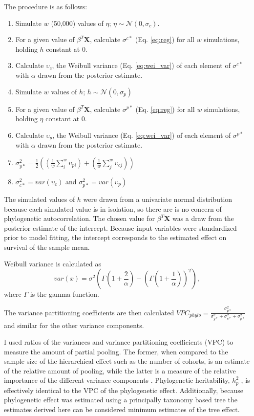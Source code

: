 \documentclass[12pt,letterpaper]{article}
\begin{document}
The procedure is as follows:
\begin{enumerate}
  \item Simulate \(w\) (50,000) values of \(\eta\); \(\eta \sim \mathcal{N}(0, \sigma_{c})\).
  \item For a given value of \(\beta^{T} \mathbf{X}\), calculate \(\sigma^{c*}\) (Eq. \ref{eq:reg}) for all \(w\) simulations, holding \(h\) constant at 0.
  \item Calculate \(\upsilon_{c}\), the Weibull variance (Eq. \ref{eq:wei_var}) of each element of \(\sigma^{c*}\) with \(\alpha\) drawn from the posterior estimate.
  \item Simulate \(w\) values of \(h\); \(h \sim \mathcal{N}(0, \sigma_{p})\)
  \item For a given value of \(\beta^{T} \mathbf{X}\), calculate \(\sigma^{p*}\) (Eq. \ref{eq:reg}) for all \(w\) simulations, holding \(\eta\) constant at 0.
  \item Calculate \(\upsilon_{p}\), the Weibull variance (Eq. \ref{eq:wei_var}) of each element of \(\sigma^{p*}\) with \(\alpha\) drawn from the posterior estimate.
  \item \(\sigma_{y*}^{2} = \frac{1}{2} \left(\left(\frac{1}{w} \sum_{i}^{w} \upsilon_{pi}\right) + \left(\frac{1}{w} \sum_{j}^{w} \upsilon_{cj}\right)\right)\)
  \item \(\sigma_{c*}^{2} = var(\upsilon_{c})\) and \(\sigma_{p*}^{2} = var(\upsilon_{p})\)
\end{enumerate}

The simulated values of \(h\) were drawn from a univariate normal distribution because each simulated value is in isolation, so there are is no concern of phylogenetic autocorrelation. The chosen value for \(\beta^{T} \mathbf{X}\) was a draw from the posterior estimate of the intercept. Because input variables were standardized prior to model fitting, the intercept corresponds to the estimated effect on survival of the sample mean.

Weibull variance is calculated as
\begin{equation}
  var(x) = \sigma^{2}\left(\Gamma\left(1 + \frac{2}{\alpha}\right) - \left(\Gamma\left(1 + \frac{1}{\alpha}\right)\right)^{2}\right),
  \label{eq:wei_var}
\end{equation}
where \(\Gamma\) is the gamma function. 

The variance partitioning coefficients are then calculated \(VPC_{phylo} = \frac{\sigma_{p*}^{2}}{\sigma_{y*}^{2} + \sigma_{c*}^{2} + \sigma_{p*}^{2}}\) and similar for the other variance components.

I used ratios of the variances and variance partitioning coefficients (VPC) to measure the amount of partial pooling. The former, when compared to the sample size of the hierarchical effect such as the number of cohorts, is an estimate of the relative amount of pooling, while the latter is a measure of the relative importance of the different variance components \citep{Gelman2007}. Phylogenetic heritability, \(h_{p}^{2}\) \citep{Housworth2004}, is effectively identical to the VPC of the phylogenetic effect. Additionally, because phylogenetic effect was estimated using a principally taxonomy based tree the estimates derived here can be considered minimum estimates of the tree effect.
\end{document}
